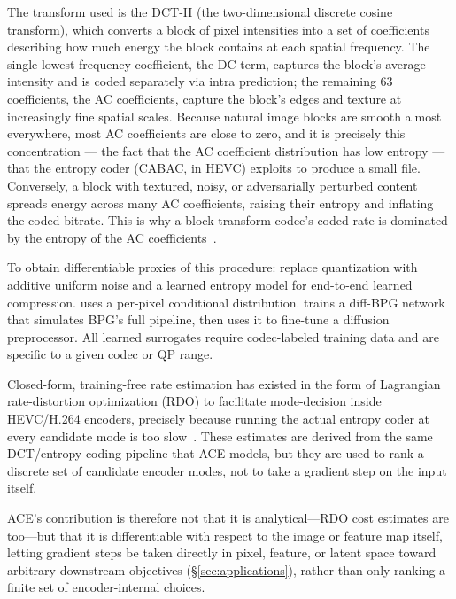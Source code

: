 \documentclass{article}
\theoremstyle{definition}
\begin{document}
The transform used is the DCT-II (the two-dimensional discrete cosine transform), which converts a block of pixel intensities into a set of coefficients describing how much energy the block contains at each spatial frequency. 
The single lowest-frequency coefficient, the DC term, captures the block's average intensity and is coded separately via intra prediction; the remaining 63 coefficients, the AC coefficients, capture the block's edges and texture at increasingly fine spatial scales.
Because natural image blocks are smooth almost everywhere, most AC coefficients are close to zero, and it is precisely this concentration --- the fact that the AC coefficient distribution has low entropy --- that the entropy coder (CABAC, in HEVC) exploits to produce a small file. 
Conversely, a block with textured, noisy, or adversarially perturbed content spreads energy across many AC coefficients, raising their entropy and inflating the coded bitrate. 
This is why a block-transform codec's coded rate is dominated by the entropy of the AC coefficients~\citep{sullivan2012hevc}.

To obtain differentiable proxies of this procedure: \citet{balle2018variational} replace quantization with additive uniform noise and a learned entropy model for end-to-end learned compression.
\citet{mentzer2018conditional} uses a per-pixel conditional distribution.
\citet{guo2026generative} trains a diff-BPG network that simulates BPG's full pipeline, then uses it to fine-tune a diffusion preprocessor.
All learned surrogates require codec-labeled training data and are specific to a given codec or QP range.

Closed-form, training-free rate estimation has existed in the form of Lagrangian rate-distortion optimization (RDO) to facilitate mode-decision inside HEVC/H.264 encoders, precisely because running the actual entropy coder at every candidate mode is too slow~\citep{sullivan1998rdo}. 
These estimates are derived from the same DCT/entropy-coding pipeline that ACE models, but they are used to rank a discrete set of candidate encoder modes, not to take a gradient step on the input itself.

ACE's contribution is therefore not that it is analytical---RDO cost estimates are too---but that it is differentiable with respect to the image or feature map itself, letting gradient steps be taken directly in pixel, feature, or latent space toward arbitrary downstream objectives (\S\ref{sec:applications}), rather than only ranking a finite set of encoder-internal choices.
\end{document}
